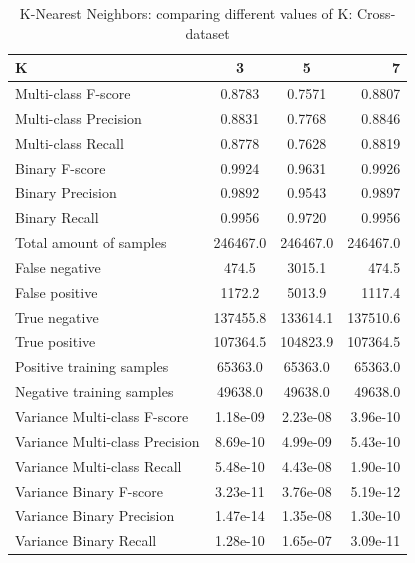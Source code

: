 \begin{table}[H]
\caption{K-Nearest Neighbors: comparing different values of K: Cross-dataset}
\label{tab:knn:k}
\centering
\begin{tabular}{l c c r}
\toprule
K & 3 & 5 & 7 \\
\midrule
Multi-class F-score & 0.8783 & 0.7571 & 0.8807 \\
Multi-class Precision & 0.8831 & 0.7768 & 0.8846 \\
Multi-class Recall & 0.8778 & 0.7628 & 0.8819 \\
\midrule
Binary F-score & 0.9924 & 0.9631 & 0.9926\\
Binary Precision & 0.9892 & 0.9543 & 0.9897 \\
Binary Recall & 0.9956 & 0.9720 & 0.9956\\
\midrule
Total amount of samples & 246467.0 & 246467.0 & 246467.0 \\
False negative & 474.5 & 3015.1 & 474.5 \\
False positive & 1172.2 & 5013.9 & 1117.4 \\
True negative & 137455.8 & 133614.1 & 137510.6 \\
True positive & 107364.5 & 104823.9 & 107364.5\\
\midrule
Positive training samples & 65363.0 & 65363.0 & 65363.0\\
Negative training samples & 49638.0 & 49638.0 & 49638.0\\
\midrule
Variance Multi-class F-score & 1.18e-09 & 2.23e-08 & 3.96e-10 \\
Variance Multi-class Precision & 8.69e-10 & 4.99e-09 & 5.43e-10 \\
Variance Multi-class Recall & 5.48e-10 & 4.43e-08 & 1.90e-10 \\
\midrule
Variance Binary F-score & 3.23e-11 & 3.76e-08 & 5.19e-12 \\
Variance Binary Precision & 1.47e-14 & 1.35e-08 & 1.30e-10 \\
Variance Binary Recall & 1.28e-10 & 1.65e-07 & 3.09e-11 \\
\bottomrule
\end{tabular}
\end{table}

